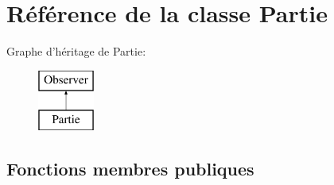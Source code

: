 \hypertarget{classPartie}{\section{\-Référence de la classe \-Partie}
\label{classPartie}
}
\-Graphe d'héritage de \-Partie\-:\begin{figure}[H]
\begin{center}
\leavevmode
\includegraphics[height=2.000000cm]{classPartie}
\end{center}
\end{figure}
\subsection*{\-Fonctions membres publiques}
